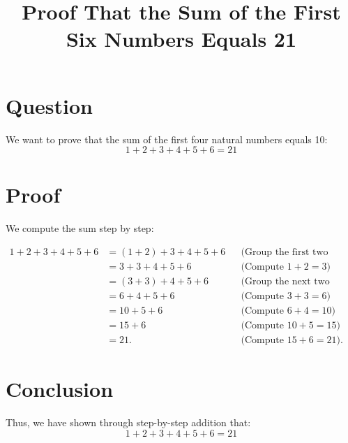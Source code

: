 \documentclass{article}
\begin{document}
\title{Proof That the Sum of the First Six Numbers Equals 21}
\maketitle

\section{Question}
We want to prove that the sum of the first four natural numbers equals 10:
\[ 1 + 2 + 3 + 4+5 +6 = 21 \]

\section{Proof}
We compute the sum step by step:

\begin{align*}
1 + 2 + 3 + 4 + 5 +6 &= (1 + 2) + 3 + 4 +5+6 && \text{(Group the first two terms)} \\
              &= 3 + 3 + 4 + 5+6         && \text{(Compute } 1 + 2 = 3\text{)} \\
              &= (3 + 3) + 4 +5+6       && \text{(Group the next two terms)} \\
              &= 6 + 4 + 5+6            && \text{(Compute } 3 + 3 = 6\text{)} \\
              &= 10 +5 +6              && \text{(Compute } 6 + 4 = 10\text{)} \\
              &= 15+6                    && \text{(Compute } 10 + 5 = 15\text{)}\\
              &=21.                         && \text{(Compute } 15 + 6 = 21\text{)}. 
\end{align*}

\section{Conclusion}
Thus, we have shown through step-by-step addition that:
\[ 1 + 2 + 3 + 4 + 5 +6= 21 \]
\end{document}
